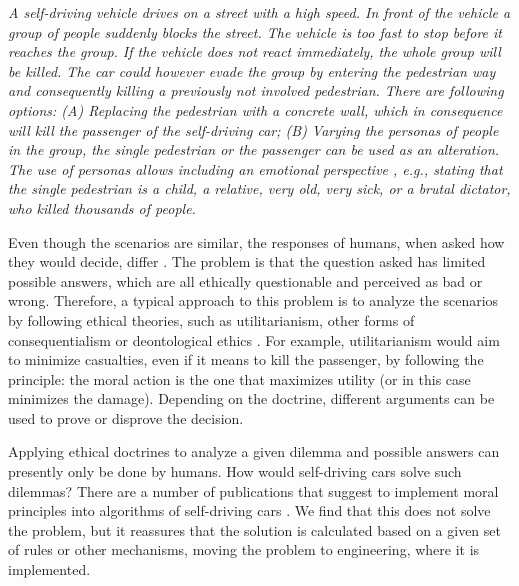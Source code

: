 \textit{
A self-driving vehicle drives on a street with a high speed. In front of the vehicle a group of people suddenly blocks the street. The vehicle is too fast to stop before it reaches the group. If the vehicle does not react immediately, the whole group will be killed. The car could however evade the group by entering the pedestrian way and consequently killing a previously not involved pedestrian. There are following options: (A) Replacing the pedestrian with a concrete wall, which in consequence will kill the passenger of the self-driving car; (B) Varying the personas of people in the group, the single pedestrian or the passenger can be used as an alteration. The use of personas allows including an emotional perspective \cite{BleskeRechek2010}, e.g., stating that the single pedestrian is a child, a relative, very old, very sick, or a brutal dictator, who killed thousands of people.}

Even though the scenarios are similar, the responses of humans, when asked how they would decide, differ \cite{Bonnefon2016}. The problem is that the question asked has limited possible answers, which are all ethically questionable and perceived as bad or wrong. Therefore, a typical approach to this problem is to analyze the scenarios by following ethical theories, such as utilitarianism, other forms of consequentialism or deontological ethics \cite{mackinnon2012ethics}. For example, utilitarianism would aim to minimize casualties, even if it means to kill the passenger, by following the principle: the moral action is the one that maximizes utility (or in this case minimizes the damage). Depending on the doctrine, different arguments can be used to prove or disprove the decision. 

Applying ethical doctrines to analyze a given dilemma and possible answers can presently only be done by humans. How would self-driving cars solve such dilemmas? There are a number of publications that suggest to implement moral principles into algorithms of self-driving cars \cite{Goodall2016,DENNIS20161,Dennis2014}. We find that this does not solve the problem, but it reassures that the solution is calculated based on a given set of rules or other mechanisms, moving the problem to engineering, where it is implemented.

